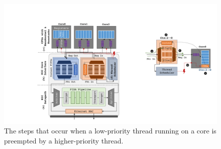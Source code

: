 \begin{figure}
  \includegraphics[width=0.95\linewidth]{./figures/thread-sched}
  \caption{The steps that occur when a low-priority thread running on a core is preempted by a higher-priority thread.}
  \label{fig:nic-scheduler}
\end{figure}